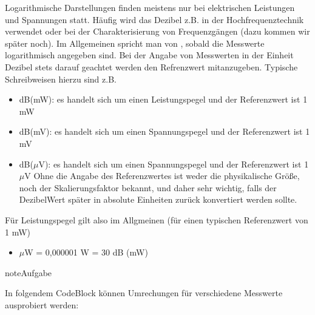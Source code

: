 \documentclass[letterpaper,10pt,english]{jupyterBook}
\begin{document}
\sphinxAtStartPar
Logarithmische Darstellungen finden meistens nur bei elektrischen Leistungen und Spannungen statt. Häufig wird das Dezibel z.B. in der Hochfrequenztechnik verwendet oder bei der Charakterisierung von Frequenzgängen (dazu kommen wir später noch). Im Allgemeinen spricht man von , sobald die Messwerte logarithmisch angegeben sind. Bei der Angabe von Messwerten in der Einheit Dezibel  stets darauf geachtet werden den Refrenzwert mitanzugeben. Typische Schreibweisen hierzu sind z.B.
\begin{itemize}
\item {} 
\sphinxAtStartPar
dB(mW): es handelt sich um einen Leistungspegel und der Referenzwert ist 1 mW

\item {} 
\sphinxAtStartPar
dB(mV): es handelt sich um einen Spannungspegel und der Referenzwert ist 1 mV

\item {} 
\sphinxAtStartPar
dB(\(\mu\)V): es handelt sich um einen Spannungspegel und der Referenzwert ist 1 \(\mu\)V
Ohne die Angabe des Referenzwertes ist weder die physikalische Größe, noch der Skalierungsfaktor bekannt, und daher sehr wichtig, falls der Dezibel\sphinxhyphen{}Wert später in absolute Einheiten zurück konvertiert werden sollte.

\end{itemize}

\sphinxAtStartPar
Für Leistungspegel gilt also im Allgmeinen (für einen typischen Referenzwert von 1 mW)
\begin{itemize}
\item {} 
 \(\mu\)W = 0,000001 W = \sphinxhyphen{}30 dB (mW)

\end{itemize}

\begin{sphinxadmonition}{note}{Aufgabe}

\sphinxAtStartPar
In folgendem Code\sphinxhyphen{}Block können Umrechungen für verschiedene Messwerte ausprobiert werden:
\end{sphinxadmonition}
\end{document}

